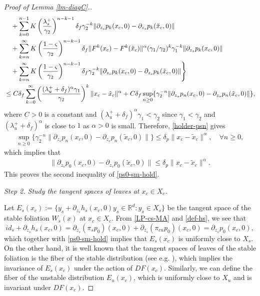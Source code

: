\documentclass[reqno]{amsart}
\numberwithin{equation}{section}
\begin{document}
\begin{proof}[Proof of Lemma {\rm \ref{lm-diagC}}.]
\begin{align}
&\quad +   \sum_{k=0}^{n-1} K \left(\frac{\lambda_s^+}{\gamma_2}\right)^{n-k-1} \delta_f \gamma_2^{-k} \|\partial_{z_s} p_k(x_{c},0) -\partial_{z_s} p_k(\tilde x_{c},0)\| 
\notag \\
&\quad + \sum_{k=n}^\infty K \left(\frac{1-\varsigma}{\gamma_2}\right)^{n-k-1} \delta_f \|F^k(x_c)-F^k(\tilde x_c)\|^\alpha (\gamma_1/\gamma_2)^k\gamma_1^{-k} \|\partial_{z_s} p_k(x_c,0)\| 
\notag \\
&\quad +  \sum_{k=n}^\infty K \left(\frac{1-\varsigma}{\gamma_2}\right)^{n-k-1} \delta_f \gamma_2^{-k} \|\partial_{z_s} p_k(x_{c},0) -\partial_{z_s} p_k(\tilde x_{c},0)\| \Bigg\}
\notag \\
&\le C\delta_f \sum_{k=0}^\infty \left(\frac{(\lambda_u^+ +\delta_f)^\alpha \gamma_1}{\gamma_2}\right)^k \|x_c-\tilde x_c\|^\alpha 
+ C\delta_f \sup_{n\ge 0}
\{\gamma_2^{-n}  \|\partial_{z_s} p_n(x_c,0)-\partial_{z_s} p_n(\tilde x_c,0)\|\},
\end{align}
where $C>0$ is a constant and $(\lambda_u^+ +\delta_f)^\alpha \gamma_1<\gamma_2$ since $\gamma_1<\gamma_2$ and 
$(\lambda_u^+ +\delta_f)^\alpha$ is close to $1$ as $\alpha>0$ is small.
Therefore, \eqref{holder-psn} gives
\begin{align*}
 \sup_{n\ge 0}\{\gamma_2^{-n} \|\partial_{z_s} p_n(x_c,0)-\partial_{z_s} p_n(\tilde x_c,0)\|\}\le  \delta_p \|x_c-\tilde x_c\|^\alpha,   \quad \forall n\ge 0, 
\end{align*}
which implies that 
\begin{align*}%
\|\partial_{z_s} p_0(x_{c},0)-\partial_{z_s} p_0(\tilde x_{c},0)\|
\le  \delta_p   \|x_c-\tilde x_c\|^\alpha.
\end{align*}
This proves the second inequality of \eqref{ps0-sm-hold}.   





{\em Step 2.   Study the tangent spaces of leaves at $x_c\in X_c$.  }


Let $E_s(x_{c}):=\{ y_s +\partial_{z_s} h_s(x_{c},0)y_s\in \mathbb R^d: y_s\in X_s\}$
be the tangent space of the stable foliation $W_s(x)$ at $x_c\in X_c$. 
From \eqref{LP-cs-MA} and \eqref{def-hs},  we see that
$$
id_s+\partial_{z_s} h_s(x_c,0)=\partial_{z_s}(\pi_s p_0)(x_c,0)+ \partial_{z_s} (\pi_{cu} p_0)(x_c,0)=\partial_{z_s} p_0(x_c,0),
$$
which together with \eqref{ps0-sm-hold}  implies that  $E_s(x_c)$ is uniformly close to $X_s$.
On the other hand, it is well known that the tangent spaces of leaves of the stable foliation is the fiber of the stable distribution (see e.g. \cite{Pesin}), which implies the invariance of $E_s(x_c)$ under the action of $DF(x_c)$. Similarly, we can define the fiber of the unstable distribution $E_u(x_c)$, which is uniformly close to $X_u$ and is invariant under $DF(x_c)$.


\end{proof}
\end{document}
